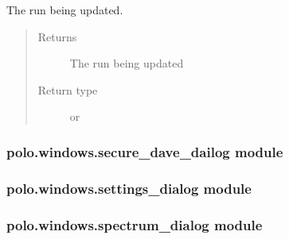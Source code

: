 \documentclass[letterpaper,10pt,english]{sphinxmanual}
\begin{document}
\begin{fulllineitems}

\begin{fulllineitems}
\label{\detokenize{polo.windows:polo.windows.run_updater_dialog.RunUpdaterDialog.run}}
The run being updated.
\begin{quote}\begin{description}
\item[{Returns}] \leavevmode
The run being updated

\item[{Return type}] \leavevmode
{\hyperref[\detokenize{polo.crystallography:polo.crystallography.run.Run}]{}} or {\hyperref[\detokenize{polo.crystallography:polo.crystallography.run.HWIRun}]{}}

\end{description}\end{quote}

\end{fulllineitems}


\end{fulllineitems}



\subsubsection{polo.windows.secure\_dave\_dailog module}
\label{\detokenize{polo.windows:polo-windows-secure-dave-dailog-module}}

\subsubsection{polo.windows.settings\_dialog module}
\label{\detokenize{polo.windows:polo-windows-settings-dialog-module}}

\subsubsection{polo.windows.spectrum\_dialog module}
\label{\detokenize{polo.windows:module-polo.windows.spectrum_dialog}}\label{\detokenize{polo.windows:polo-windows-spectrum-dialog-module}}
\end{document}
